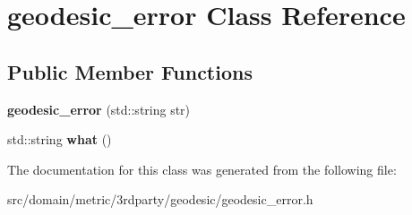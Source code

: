 \hypertarget{classgeodesic__error}{}\section{geodesic\+\_\+error Class Reference}
\label{classgeodesic__error}
\subsection*{Public Member Functions}
\begin{DoxyCompactItemize}
\item 
\hypertarget{classgeodesic__error_adcc7b4c1b2c96464cf807486fbc94c93}{}{\bfseries geodesic\+\_\+error} (std\+::string str)\label{classgeodesic__error_adcc7b4c1b2c96464cf807486fbc94c93}

\item 
\hypertarget{classgeodesic__error_ab51039328fe8a49a49cd71e4e0348507}{}std\+::string {\bfseries what} ()\label{classgeodesic__error_ab51039328fe8a49a49cd71e4e0348507}

\end{DoxyCompactItemize}


The documentation for this class was generated from the following file\+:\begin{DoxyCompactItemize}
\item 
src/domain/metric/3rdparty/geodesic/geodesic\+\_\+error.\+h\end{DoxyCompactItemize}
